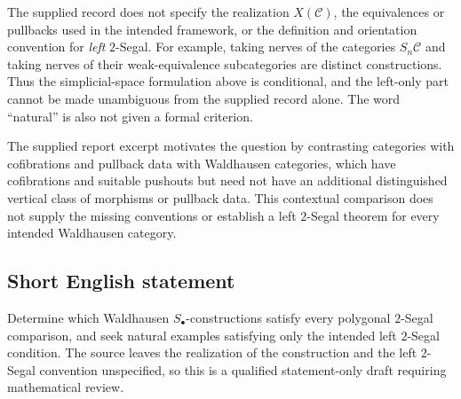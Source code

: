 \documentclass[11pt]{article}
\begin{document}
The supplied record does not specify the realization \(X(\mathcal C)\), the equivalences or pullbacks used in the intended framework, or the definition and orientation convention for \emph{left} \(2\)-Segal. For example, taking nerves of the categories \(S_n\mathcal C\) and taking nerves of their weak-equivalence subcategories are distinct constructions. Thus the simplicial-space formulation above is conditional, and the left-only part cannot be made unambiguous from the supplied record alone. The word ``natural'' is also not given a formal criterion.

The supplied report excerpt motivates the question by contrasting categories with cofibrations and pullback data with Waldhausen categories, which have cofibrations and suitable pushouts but need not have an additional distinguished vertical class of morphisms or pullback data. This contextual comparison does not supply the missing conventions or establish a left \(2\)-Segal theorem for every intended Waldhausen category.
\subsection{Short English statement}
Determine which Waldhausen \(S_\bullet\)-constructions satisfy every polygonal \(2\)-Segal comparison, and seek natural examples satisfying only the intended left \(2\)-Segal condition. The source leaves the realization of the construction and the left \(2\)-Segal convention unspecified, so this is a qualified statement-only draft requiring mathematical review.
\end{document}
